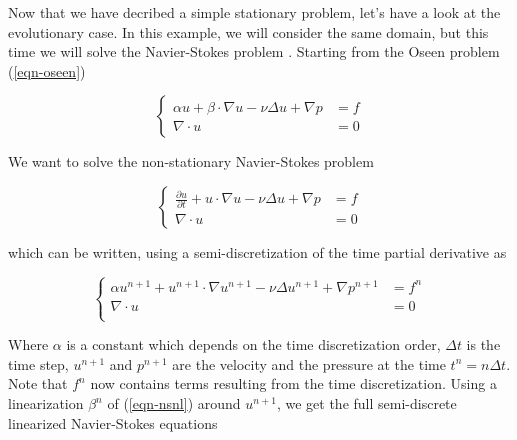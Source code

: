 %
%
%
%
%


Now that we have decribed a simple stationary problem, let's have a look at the evolutionary
case. In this example, we will consider the same domain, but this time we will solve the
Navier-Stokes problem . Starting from the Oseen problem (\ref{eqn-oseen})

\begin{equation*}
\left\{
\begin{array}{rl}
\displaystyle \alpha u + \beta \cdot \nabla u - \nu \Delta u+
\nabla p & = f \\
\displaystyle \nabla \cdot u & = 0
\end{array}
\right.
\end{equation*}

We want to solve the non-stationary Navier-Stokes problem

\begin{equation*} \label{eqn-navierstokes}
\left\{
\begin{array}{rl}
\displaystyle \frac{\partial u}{\partial t} + u \cdot \nabla u - \nu \Delta u+
\nabla p & = f \\
\displaystyle \nabla \cdot u & = 0
\end{array}
\right.
\end{equation*}

which can be written, using a semi-discretization of the time partial derivative as

\begin{equation*} \label{eqn-nsnl}
\left\{
\begin{array}{rl}
\displaystyle \alpha u^{n+1} + u^{n+1} \cdot \nabla u^{n+1} - \nu \Delta u^{n+1}+
\nabla p^{n+1} & = f^n  \\
\displaystyle \nabla \cdot u & = 0  \\
\end{array}
\right.
\end{equation*}

Where $\alpha$ is a constant which depends on the time discretization order, 
$\Delta t$ is the time step, $u^{n+1}$ and $p^{n+1}$ 
are the velocity and the pressure at the time $t^n = n\Delta t$.
Note that $f^n$ now contains terms resulting from the time discretization.
Using a linearization $\beta^n$ of (\ref{eqn-nsnl}) around $u^{n+1}$, 
we get the full semi-discrete linearized Navier-Stokes
equations

